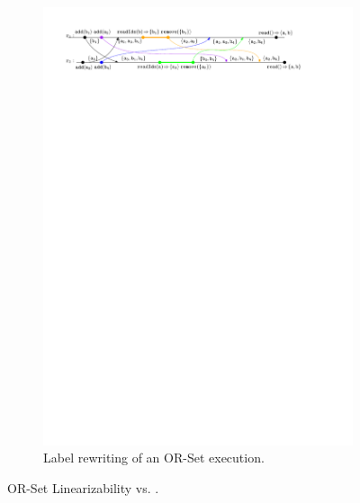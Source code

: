 \begin{figure}[t]
  \begin{subfigure}{.9\linewidth}
    \centering
    \includegraphics[width=0.95 \textwidth]{./figures/OR-Set-lk-rem}
    \caption{Label rewriting of an OR-Set execution.}
    \label{fig:or-set-lk-rem}
  \end{subfigure}
  \caption{OR-Set Linearizability vs. \CRDTLinshort{}.}
\end{figure}

